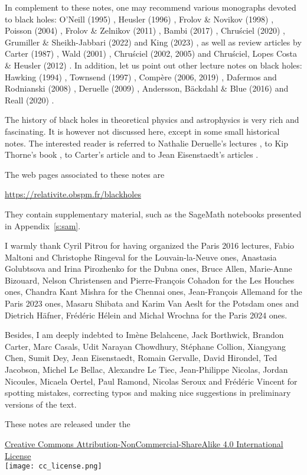 \vspace{2ex}

In complement to these notes, one may recommend various monographs devoted to black holes:
O'Neill (1995) \cite{ONeil95}, Heusler (1996) \cite{Heusl96}, Frolov \& Novikov (1998) \cite{FroloN98},
Poisson (2004) \cite{Poiss04}, Frolov \& Zelnikov (2011) \cite{FroloZ11}, Bambi (2017) \cite{Bambi17},
Chru\'sciel (2020) \cite{Chrus20}, Grumiller \& Sheikh-Jabbari (2022) \cite{GrumiS22}
and King (2023) \cite{King23},
as well as review articles by
Carter (1987) \cite{Carte87}, Wald (2001) \cite{Wald01},
Chru\'sciel (2002, 2005) \cite{Chrus02, Chrus05} and Chru\'sciel, Lopes Costa \& Heusler (2012) \cite{ChrusLH12}.
In addition, let us point out other lecture notes on black holes:
Hawking (1994) \cite{Hawki94,HawkiP15}, Townsend (1997) \cite{Towns97},
Compère (2006, 2019) \cite{Compe06,Compe19}, Dafermos and Rodnianski (2008) \cite{DaferR13},
Deruelle (2009) \cite{Derue09}, Andersson, Bäckdahl \& Blue (2016) \cite{AnderBB18}
and Reall (2020) \cite{Reall20}.

The history of black holes in theoretical physics and astrophysics is
very rich and fascinating. It is however not discussed here, except in some
small historical notes. The interested
reader is referred to Nathalie Deruelle's lectures \cite{Derue09}, to Kip Thorne's
book \cite{Thorn94}, to Carter's article \cite{Carte06}
and to Jean Eisenstaedt's articles \cite{Eisen82,Eisen93}.


The web pages associated to these notes are
\begin{center}
\url{https://relativite.obspm.fr/blackholes}
\end{center}
They contain supplementary material, such as the SageMath notebooks presented in
Appendix~\ref{s:sam}.

\vspace{2ex}

I warmly thank Cyril Pitrou for having organized the Paris 2016 lectures,
Fabio Maltoni and Christophe Ringeval for the Louvain-la-Neuve ones,
Anastasia Golubtsova and Irina Pirozhenko for the Dubna ones,
Bruce Allen, Marie-Anne Bizouard, Nelson Christensen and Pierre-François Cohadon for the Les Houches ones,
Chandra Kant Mishra for the Chennai ones,
Jean-François Allemand for the Paris 2023 ones, Masaru Shibata and Karim Van Aeslt for the Potsdam ones and Dietrich Häfner, Frédéric Hélein and Michał Wrochna for the Paris 2024 ones.

Besides, I am deeply indebted to
Imène Belahcene, Jack Borthwick, Brandon Carter, Marc Casals,
Udit Narayan Chowdhury, Stéphane Collion, Xiangyang Chen,
Sumit Dey, Jean Eisenstaedt, Romain Gervalle, David Hirondel,
Ted Jacobson, Michel Le Bellac, Alexandre Le Tiec,
Jean-Philippe Nicolas, Jordan Nicoules, Micaela Oertel,
Paul Ramond, Nicolas Seroux and Frédéric Vincent for spotting mistakes, correcting typos and making
nice suggestions in preliminary versions of the text.


\vspace{3ex}
These notes are released under the
\begin{center}
\href{https://creativecommons.org/licenses/by-nc-sa/4.0/}{{Creative Commons Attribution-NonCommercial-ShareAlike 4.0 International License}}\\[1ex]
\texttt{[image: cc\_license.png]}
\end{center}

